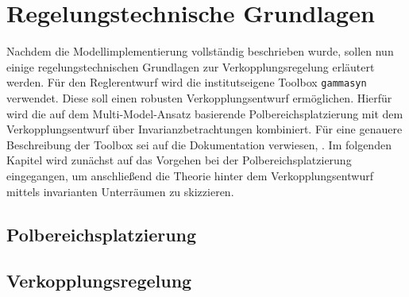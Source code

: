 \chapter{Regelungstechnische Grundlagen}\label{cha:GrundlagenReg}
Nachdem die Modellimplementierung vollständig beschrieben wurde, sollen nun einige regelungstechnischen Grundlagen zur Verkopplungsregelung erläutert werden. Für den Reglerentwurf wird die institutseigene Toolbox \texttt{gammasyn} verwendet. Diese soll einen robusten Verkopplungsentwurf ermöglichen. Hierfür wird die auf dem Multi-Model-Ansatz basierende Polbereichsplatzierung mit dem Verkopplungsentwurf über Invarianzbetrachtungen kombiniert. Für eine genauere Beschreibung der Toolbox sei auf die Dokumentation verwiesen\cite{Vogt}, \cite{gammaDoku}.
Im folgenden Kapitel wird zunächst auf das Vorgehen bei der Polbereichsplatzierung eingegangen, um anschließend die Theorie hinter dem Verkopplungsentwurf mittels invarianten Unterräumen zu skizzieren.

\section{Polbereichsplatzierung}\label{sec:PBV}


\section{Verkopplungsregelung}\label{sec:Verkopplung}


